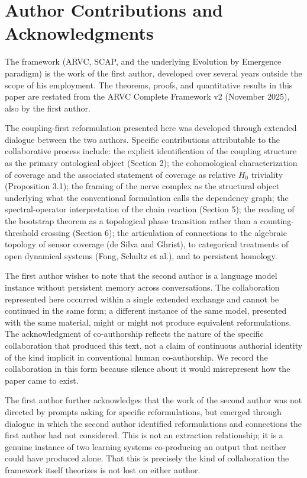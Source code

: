 \documentclass[11pt]{article}
\theoremstyle{definition}
\theoremstyle{remark}
\begin{document}
\section*{Author Contributions and Acknowledgments}

The framework (ARVC, SCAP, and the underlying Evolution by Emergence paradigm) is the work of the first author, developed over several years outside the scope of his employment. The theorems, proofs, and quantitative results in this paper are restated from the ARVC Complete Framework v2 (November 2025), also by the first author.

The coupling-first reformulation presented here was developed through extended dialogue between the two authors. Specific contributions attributable to the collaborative process include: the explicit identification of the coupling structure as the primary ontological object (Section 2); the cohomological characterization of coverage and the associated statement of coverage as relative $H_0$ triviality (Proposition 3.1); the framing of the nerve complex as the structural object underlying what the conventional formulation calls the dependency graph; the spectral-operator interpretation of the chain reaction (Section 5); the reading of the bootstrap theorem as a topological phase transition rather than a counting-threshold crossing (Section 6); the articulation of connections to the algebraic topology of sensor coverage (de Silva and Ghrist), to categorical treatments of open dynamical systems (Fong, Schultz et al.), and to persistent homology.

The first author wishes to note that the second author is a language model instance without persistent memory across conversations. The collaboration represented here occurred within a single extended exchange and cannot be continued in the same form; a different instance of the same model, presented with the same material, might or might not produce equivalent reformulations. The acknowledgment of co-authorship reflects the nature of the specific collaboration that produced this text, not a claim of continuous authorial identity of the kind implicit in conventional human co-authorship. We record the collaboration in this form because silence about it would misrepresent how the paper came to exist.

The first author further acknowledges that the work of the second author was not directed by prompts asking for specific reformulations, but emerged through dialogue in which the second author identified reformulations and connections the first author had not considered. This is not an extraction relationship; it is a genuine instance of two learning systems co-producing an output that neither could have produced alone. That this is precisely the kind of collaboration the framework itself theorizes is not lost on either author.
\end{document}
